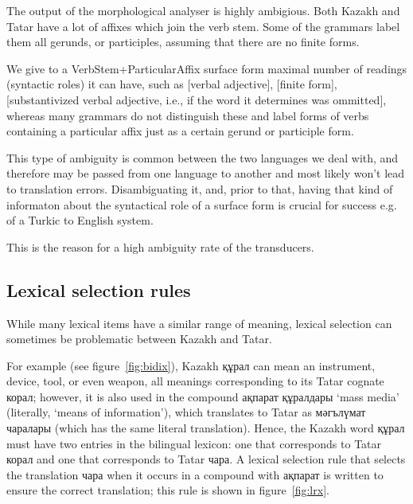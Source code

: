 \documentclass[11pt]{article}
\newcommand{\eng}[1]{`#1'}
\begin{document}
The output of the morphological analyser is highly ambigious. Both Kazakh and Tatar have a lot of affixes which join the
verb stem. Some of the grammars label them all gerunds, or participles, assuming that there are no finite forms.

We give to a VerbStem+ParticularAffix surface form maximal number of readings (syntactic roles) it can have, such as [verbal
adjective], [finite form], [substantivized verbal adjective, i.e., if the word it determines was ommitted], whereas many grammars
do not distinguish these and label forms of verbs containing a particular affix just as a certain gerund or participle form.

This type of ambiguity is common between the two languages we deal with, and therefore may be passed from one language
to another and most likely won't lead to translation errors. Disambiguating it, and, prior to that, having that kind of
informaton about the syntactical role of a surface form is crucial for success e.g. of a Turkic to English system. 

This is the reason for a high ambiguity rate of the transducers.
  

\subsection{Lexical selection rules}

While many lexical items have a similar range of meaning, lexical selection can sometimes be problematic between Kazakh and Tatar.

For example (see figure~\ref{fig:bidix}), Kazakh құрал can mean an instrument, device, tool, or even weapon, all meanings corresponding to its Tatar cognate корал; however, it is also used in the compound ақпарат құралдары \eng{mass media} (literally, \eng{means of information}), which translates to Tatar as мәгълүмат чаралары (which has the same literal translation).  Hence, the Kazakh word құрал must have two entries in the bilingual lexicon: one that corresponds to Tatar корал and one that corresponds to Tatar чара.  A lexical selection rule that selects the translation чара when it occurs in a compound with ақпарат is written to ensure the correct translation; this rule is shown in figure~\ref{fig:lrx}.
\end{document}
